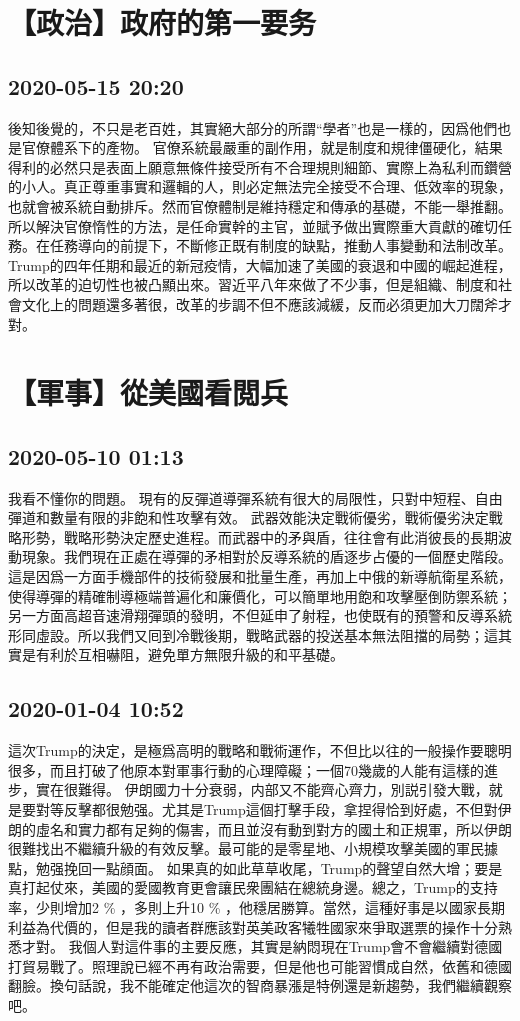 \documentclass[twocolumn]{ctexart}
\begin{document}
\section*{【政治】政府的第一要务}
\subsection*{2020-05-15 20:20}

後知後覺的，不只是老百姓，其實絕大部分的所謂“學者”也是一樣的，因爲他們也是官僚體系下的產物。
官僚系統最嚴重的副作用，就是制度和規律僵硬化，結果得利的必然只是表面上願意無條件接受所有不合理規則細節、實際上為私利而鑽營的小人。真正尊重事實和邏輯的人，則必定無法完全接受不合理、低效率的現象，也就會被系統自動排斥。然而官僚體制是維持穩定和傳承的基礎，不能一舉推翻。
所以解決官僚惰性的方法，是任命實幹的主官，並賦予做出實際重大貢獻的確切任務。在任務導向的前提下，不斷修正既有制度的缺點，推動人事變動和法制改革。
Trump的四年任期和最近的新冠疫情，大幅加速了美國的衰退和中國的崛起進程，所以改革的迫切性也被凸顯出來。習近平八年來做了不少事，但是組織、制度和社會文化上的問題還多著很，改革的步調不但不應該減緩，反而必須更加大刀闊斧才對。
\section*{【軍事】從美國看閲兵}
\subsection*{2020-05-10 01:13}

我看不懂你的問題。 
現有的反彈道導彈系統有很大的局限性，只對中短程、自由彈道和數量有限的非飽和性攻擊有效。 
武器效能決定戰術優劣，戰術優劣決定戰略形勢，戰略形勢決定歷史進程。而武器中的矛與盾，往往會有此消彼長的長期波動現象。我們現在正處在導彈的矛相對於反導系統的盾逐步占優的一個歷史階段。這是因爲一方面手機部件的技術發展和批量生產，再加上中俄的新導航衛星系統，使得導彈的精確制導極端普遍化和廉價化，可以簡單地用飽和攻擊壓倒防禦系統；另一方面高超音速滑翔彈頭的發明，不但延申了射程，也使既有的預警和反導系統形同虛設。所以我們又囘到冷戰後期，戰略武器的投送基本無法阻擋的局勢；這其實是有利於互相嚇阻，避免單方無限升級的和平基礎。
\subsection*{2020-01-04 10:52}

這次Trump的決定，是極爲高明的戰略和戰術運作，不但比以往的一般操作要聰明很多，而且打破了他原本對軍事行動的心理障礙；一個70幾歲的人能有這樣的進步，實在很難得。
伊朗國力十分衰弱，内部又不能齊心齊力，別説引發大戰，就是要對等反擊都很勉强。尤其是Trump這個打擊手段，拿捏得恰到好處，不但對伊朗的虛名和實力都有足夠的傷害，而且並沒有動到對方的國土和正規軍，所以伊朗很難找出不繼續升級的有效反擊。最可能的是零星地、小規模攻擊美國的軍民據點，勉强挽回一點顔面。
如果真的如此草草收尾，Trump的聲望自然大增；要是真打起仗來，美國的愛國教育更會讓民衆團結在總統身邊。總之，Trump的支持率，少則增加2 \% ，多則上升10 \% ，他穩居勝算。當然，這種好事是以國家長期利益為代價的，但是我的讀者群應該對英美政客犧牲國家來爭取選票的操作十分熟悉才對。
我個人對這件事的主要反應，其實是納悶現在Trump會不會繼續對德國打貿易戰了。照理說已經不再有政治需要，但是他也可能習慣成自然，依舊和德國翻臉。換句話說，我不能確定他這次的智商暴漲是特例還是新趨勢，我們繼續觀察吧。
\end{document}
